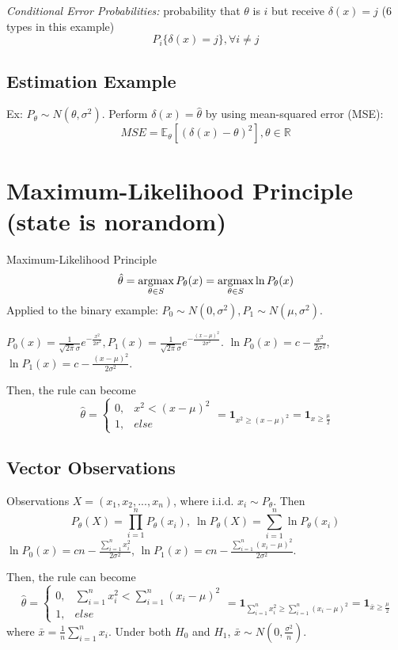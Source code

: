 \documentclass[11pt]{elegantbook}
\newcommand{\argmax}{\operatornamewithlimits{argmax}}
\begin{document}
\textit{Conditional Error Probabilities:} probability that $\theta$ is $i$ but receive $\delta(x)=j$ (6 types in this example) $$P_i\{\delta(x)=j\}, \forall i\neq j$$

\subsection*{Estimation Example}
Ex: $P_\theta\sim N(\theta,\sigma^2)$. Perform $\delta(x)=\hat{\theta}$ by using mean-squared error (MSE):
$$MSE= \mathbb{E}_\theta \left[(\delta(x)-\theta)^2\right],\theta\in \mathbb{R}$$

\section{Maximum-Likelihood Principle (state is norandom)}
Maximum-Likelihood Principle $$\hat{\theta}=\argmax_{\theta\in S}P_{\theta}(x)=\argmax_{\theta\in S}\ln P_{\theta}(x)$$
Applied to the binary example: $P_0\sim N(0,\sigma^2), P_1\sim N(\mu,\sigma^2)$.

$P_0(x)=\frac{1}{\sqrt{2\pi}\sigma}e^{-\frac{x^2}{2\sigma^2}}, P_1(x)=\frac{1}{\sqrt{2\pi}\sigma}e^{-\frac{(x-\mu)^2}{2\sigma^2}}$. $\ln P_0(x)=c-\frac{x^2}{2\sigma^2}$, $\ln P_1(x)=c-\frac{(x-\mu)^2}{2\sigma^2}$.

Then, the rule can become $$\hat{\theta}=\left\{\begin{matrix}
    0,&x^2<(x-\mu)^2\\
    1,&else
\end{matrix}\right.=\mathbf{1}_{x^2\geq (x-\mu)^2}=\mathbf{1}_{x\geq \frac{\mu}{2}}$$

\subsection*{Vector Observations}
Observations $X=\left(x_1,x_2,...,x_n\right)$, where i.i.d. $x_i\sim P_\theta$. Then $$P_\theta(X)=\prod_{i=1}^n P_\theta(x_i),\ \ln P_\theta(X)=\sum_{i=1}^n\ln P_\theta(x_i)$$
$\ln P_0(x)=cn-\frac{\sum_{i=1}^n x_i^2}{2\sigma^2}$, $\ln P_1(x)=cn-\frac{\sum_{i=1}^n(x_i-\mu)^2}{2\sigma^2}$.

Then, the rule can become $$\hat{\theta}=\left\{\begin{matrix}
    0,&\sum_{i=1}^nx_i^2<\sum_{i=1}^n(x_i-\mu)^2\\
    1,&else
\end{matrix}\right.=\mathbf{1}_{\sum_{i=1}^nx_i^2\geq \sum_{i=1}^n(x_i-\mu)^2}=\mathbf{1}_{\bar{x}\geq \frac{\mu}{2}}$$
where $\bar{x}=\frac{1}{n}\sum_{i=1}^nx_i$. Under both $H_0$ and $H_1$, $\bar{x}\sim N(0,\frac{\sigma^2}{n})$.
\end{document}
